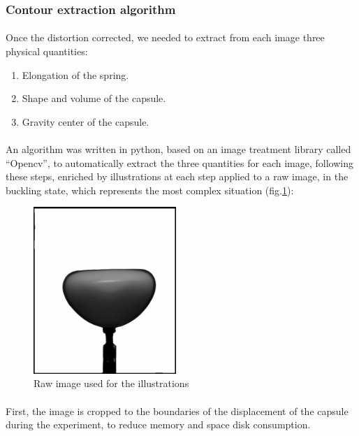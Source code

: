 \subsubsection{Contour extraction algorithm}
\paragraph{}
Once the distortion corrected, we needed to extract from each image three physical quantities:
\begin{enumerate}
	\item Elongation of the spring.
	\item Shape and volume of the capsule.
	\item Gravity center of the capsule.
\end{enumerate}
\paragraph{}
An algorithm was written in python, based on an image treatment library called "`Opencv"', to automatically extract the three quantities for each image, following these steps, enriched by illustrations at each step applied to a raw image, in the buckling state, which represents the most complex  situation (fig.\ref{fig:raw_image}):
\begin{figure}[H] %
	\centering%
  \includegraphics[width=0.48\textwidth]{figures/Chapter_1/raw_image.png}
	\caption{Raw image used for the illustrations}
	\label{fig:raw_image}
\end{figure}
\paragraph{}
First, the image is cropped to the boundaries of the displacement of the capsule during the experiment, to reduce memory and space disk consumption.
